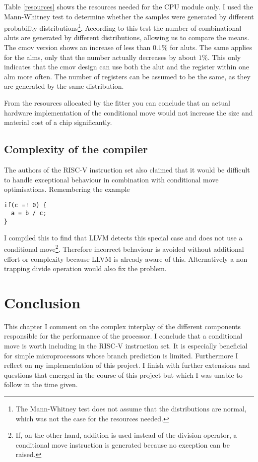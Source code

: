 \documentclass[12pt,twoside,notitlepage]{report}
\begin{document}
Table \ref{resources} shows the resources needed for the CPU module only.
I used the Mann-Whitney\cite{mann1947test} test to determine whether the samples were generated by different probability distributions\footnote{The Mann-Whitney test does not assume that the distributions are normal, which was not the case for the resources needed.}.
According to this test the number of combinational \gls{alut}s are generated by different distributions, allowing us to compare the means. The cmov version shows an increase of less than $0.1\%$ for \gls{alut}s. 
The same applies for the \gls{alm}s, only that the number actually decreases by about $1\%$. This only indicates that the cmov design can use both the \gls{alut} and the register within one \gls{alm} more often. The number of registers can be assumed to be the same, as they are generated by the same distribution. 

From the resources allocated by the fitter you can conclude that an actual hardware implementation of the conditional move would not increase the size and material cost of a chip significantly.


\section{Complexity of the compiler}

The authors of the RISC-V instruction set also claimed that it would be difficult to handle exceptional behaviour in combination with conditional move optimisations. Remembering the example
\begin{verbatim}
if(c =! 0) {
  a = b / c;
}
\end{verbatim}
I compiled this to find that LLVM detects this special case and does not use a conditional move\footnote{If, on the other hand, addition is used instead of the division operator, a conditional move instruction is generated because no exception can be raised.}. Therefore incorrect behaviour is avoided without additional effort or complexity because LLVM is already aware of this. Alternatively a non-trapping divide operation would also fix the problem.


\cleardoublepage
\chapter{Conclusion}

This chapter I comment on the complex interplay of the different components responsible for the performance of the processor. I conclude that a conditional move is worth including in the RISC-V instruction set. It is especially beneficial for simple microprocessors whose branch prediction is limited. Furthermore I reflect on my implementation of this project. I finish with further extensions and questions that emerged in the course of this project but which I was unable to follow in the time given.
\end{document}
